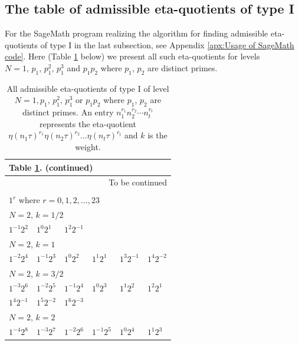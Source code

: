 \documentclass[12pt]{amsart}
\numberwithin{equation}{section}
\theoremstyle{plain}
\theoremstyle{definition}
\theoremstyle{remark}
\begin{document}
\subsection{The table of admissible eta-quotients of type I}
For the SageMath program realizing the algorithm for finding admissible eta-quotients of type I in the last subsection, see Appendix \ref{apx:Usage of SageMath code}. Here (Table \ref{table:admissibleTypeI} below) we present all such eta-quotients for levels $N=1,\,p_1,\,p_1^2,\,p_1^3$ and $p_1p_2$ where $p_1$, $p_2$ are distinct primes.

\begin{longtable}{llllll}
\caption{All admissible eta-quotients of type I of level $N=1,p_1,\,p_1^2,\,p_1^3$ or $p_1p_2$ where $p_1$, $p_2$ are distinct primes. An entry $n_1^{r_1}n_2^{r_2}\cdots n_t^{r_t}$ represents the eta-quotient $\eta(n_1\tau)^{r_1}\eta(n_2\tau)^{r_2}\dots\eta(n_t\tau)^{r_t}$ and $k$ is the weight.\label{table:admissibleTypeI}} \\
\toprule
\endfirsthead
\multicolumn{6}{l}{Table \ref{table:admissibleTypeI}. (continued)} \\
\toprule
\endhead
\bottomrule
\multicolumn{6}{r}{To be continued} \\[2ex]
\endfoot
\bottomrule
\endlastfoot
\multicolumn{6}{l}{$N=1$}\\
\multicolumn{6}{l}{$1^r$ where $r=0,1,2,\dots,23$}\\
\midrule
\multicolumn{6}{l}{$N=2$, $k=1/2$}\\
$1^{-1}2^{2}$ & $1^{0}2^{1}$ & $1^{2}2^{-1}$ & &&\\
\midrule
\multicolumn{6}{l}{$N=2$, $k=1$}\\
$1^{-2}2^{4}$ & $1^{-1}2^{3}$ & $1^{0}2^{2}$ & $1^{1}2^{1}$ & $1^{3}2^{-1}$ & $1^{4}2^{-2}$\\
\midrule
\multicolumn{6}{l}{$N=2$, $k=3/2$}\\
$1^{-3}2^{6}$ & $1^{-2}2^{5}$ & $1^{-1}2^{4}$ & $1^{0}2^{3}$ & $1^{1}2^{2}$ & $1^{2}2^{1}$\\
$1^{4}2^{-1}$ & $1^{5}2^{-2}$ & $1^{6}2^{-3}$ & &&\\
\midrule
\multicolumn{6}{l}{$N=2$, $k=2$}\\
$1^{-4}2^{8}$ & $1^{-3}2^{7}$ & $1^{-2}2^{6}$ & $1^{-1}2^{5}$ & $1^{0}2^{4}$ & $1^{1}2^{3}$\\

\end{longtable}
\end{document}
